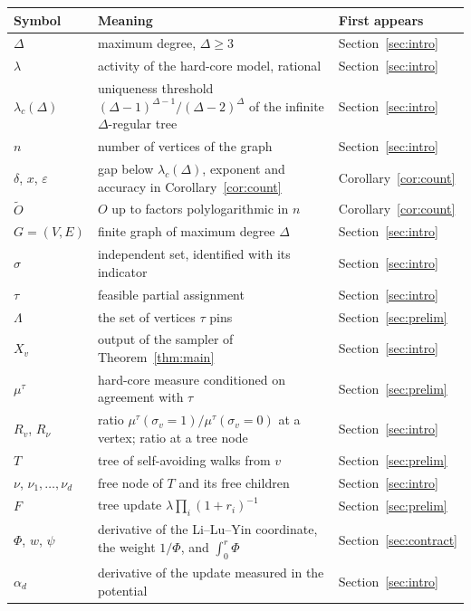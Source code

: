 \documentclass[11pt]{amsart}
\newcommand{\lc}{\lambda_c(\Delta)}
\begin{document}
\begin{center}
\begin{tabular}{@{}lp{}l@{}}
\toprule
Symbol & Meaning & First appears\\
\midrule
$\Delta$ & maximum degree, $\Delta\ge3$ & Section~\ref{sec:intro}\\
$\lambda$ & activity of the hard-core model, rational & Section~\ref{sec:intro}\\
$\lc$ & uniqueness threshold $(\Delta-1)^{\Delta-1}/(\Delta-2)^{\Delta}$ of the infinite $\Delta$-regular tree & Section~\ref{sec:intro}\\
$n$ & number of vertices of the graph & Section~\ref{sec:intro}\\
$\delta$, $x$, $\varepsilon$ & gap below $\lc$, exponent and accuracy in Corollary~\ref{cor:count} & Corollary~\ref{cor:count}\\
$\tilde O$ & $O$ up to factors polylogarithmic in $n$ & Corollary~\ref{cor:count}\\
$G=(V,E)$ & finite graph of maximum degree $\Delta$ & Section~\ref{sec:intro}\\
$\sigma$ & independent set, identified with its indicator & Section~\ref{sec:intro}\\
$\tau$ & feasible partial assignment & Section~\ref{sec:intro}\\
$\Lambda$ & the set of vertices $\tau$ pins & Section~\ref{sec:prelim}\\
$X_v$ & output of the sampler of Theorem~\ref{thm:main} & Section~\ref{sec:intro}\\
$\mu^\tau$ & hard-core measure conditioned on agreement with $\tau$ & Section~\ref{sec:prelim}\\
$R_v$, $R_\nu$ & ratio $\mu^\tau(\sigma_v=1)/\mu^\tau(\sigma_v=0)$ at a vertex; ratio at a tree node & Section~\ref{sec:intro}\\
$T$ & tree of self-avoiding walks from $v$ & Section~\ref{sec:prelim}\\
$\nu$, $\nu_1,\dots,\nu_d$ & free node of $T$ and its free children & Section~\ref{sec:intro}\\
$F$ & tree update $\lambda\prod_i(1+r_i)^{-1}$ & Section~\ref{sec:prelim}\\
$\Phi$, $w$, $\psi$ & derivative of the Li--Lu--Yin coordinate, the weight $1/\Phi$, and $\int_0^r\Phi$ & Section~\ref{sec:contract}\\
$\alpha_d$ & derivative of the update measured in the potential & Section~\ref{sec:intro}\\

\end{tabular}
\end{center}
\end{document}
